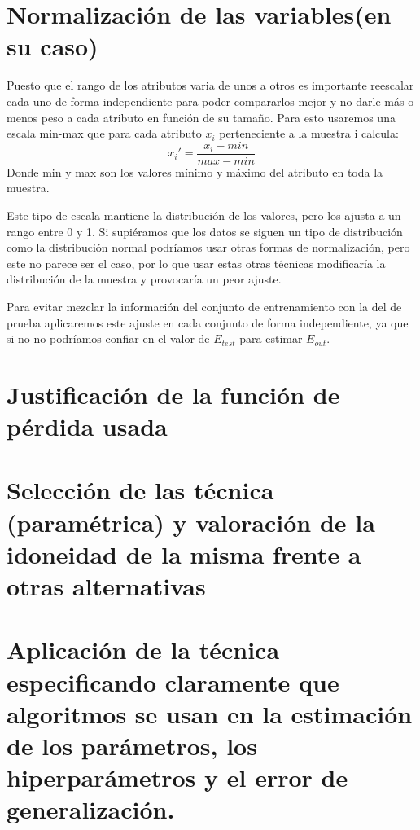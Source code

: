 \documentclass{article}
\begin{document}
	
	\section{Normalización de las variables(en su caso)} %
	Puesto que el rango de los atributos varia de unos a otros es importante reescalar cada uno de forma independiente para poder compararlos mejor y no darle más o menos peso a cada atributo en función de su tamaño. Para esto usaremos una escala min-max que para cada atributo $x_i$ perteneciente a la muestra i calcula:
\begin{equation}
x_i' = \frac{x_i-min}{max-min}
\end{equation}
\indent Donde min y max son los valores mínimo y máximo del atributo en toda la muestra.
\par 
Este tipo de escala mantiene la distribución de los valores, pero los ajusta a un rango entre 0 y 1.  Si supiéramos que los datos se siguen un tipo de distribución como la distribución normal podríamos usar otras formas de normalización, pero este no parece ser el caso, por lo que usar estas otras técnicas modificaría la distribución de la muestra y provocaría un peor ajuste.
\par 
Para evitar mezclar la información del conjunto de entrenamiento con la del de prueba aplicaremos este ajuste en cada conjunto de forma independiente, ya que si no no podríamos confiar en el valor de $E_{test}$ para estimar $E_{out}$.
	
	
	\section{Justificación de la función de pérdida usada} %
	
	
	
	\section{Selección de las técnica (paramétrica) y valoración de la idoneidad de la misma frente a otras alternativas} %
	
	
	
	\section{Aplicación de la técnica especificando claramente que algoritmos se usan en la estimación de los parámetros, los hiperparámetros y el error de generalización.} %
	
\end{document}
